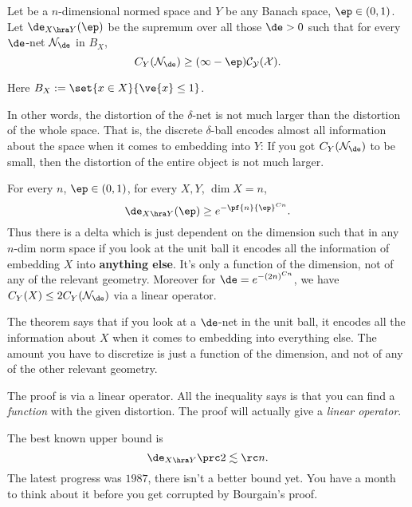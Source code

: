 \begin{df}
Let be a $n$-dimensional normed space and $Y$ be any Banach space, $\ep\in (0,1)$. Let $\de_{X\hra Y}(\ep)$ be the supremum over all those $\de>0$ such that for every $\de$-net $\cal N_\de$ in $B_X$, 
\[C_Y(\cal N_\de)\ge (1-\ep)C_Y(X).\]

Here $B_X:=\set{x\in X}{\ve{x}\le 1}$.
\end{df}
In other words, the distortion of the $\delta$-net is not much larger than the distortion of the whole space. That is, the discrete $\delta$-ball encodes almost all information about the space when it comes to embedding into $Y$: If you got $C_Y(\cal N_\de)$ to be small, then the distortion of the entire object is not much larger.
\begin{thm}\label{thm:bdt}
For every $n$, $\ep\in (0,1)$, for every $X,Y$, $\dim X=n$, 
\[
\de_{X\hra Y}(\ep)\ge  e^{-\pf{n}{\ep}^{Cn}}.
\]
Thus there is a delta which is just dependent on the dimension such that in any $n$-dim norm space if you look at the unit ball it encodes all the information of embedding $X$ into \textbf{anything else}. It's only a function of the dimension, not of any of the relevant geometry. 
Moreover for $\de=e^{-(2n)^{Cn}}$, we have $C_Y(X)\le 2C_Y(\cal N_\de)$ via a linear operator. 
\end{thm}

The theorem says that if you look at a $\de$-net in the unit ball, it encodes all the information about $X$ when it comes to embedding into everything else. %
The amount you have to discretize is just a function of the dimension, and not of any of the other relevant geometry.
\begin{rem}
The proof is via a linear operator. All the inequality says is that you can find a \emph{function} with the given distortion. The proof will actually give a \emph{linear operator}. 
\end{rem}

The best known upper bound is 
\[
\de_{X\hra Y}\prc2 \lesssim\rc n.
\]
The latest progress was $1987$, there isn't a better bound yet. You have a month to think about it before you get corrupted by Bourgain's proof. 

